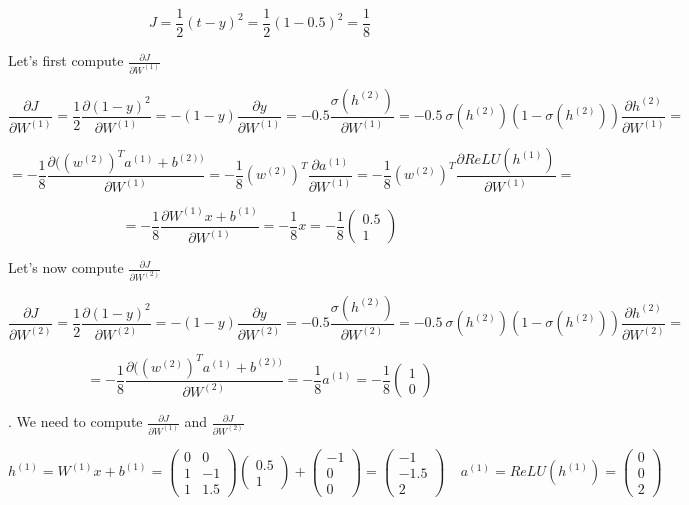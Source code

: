 $$ J = \frac{1}{2} (t - y)^2 = \frac{1}{2} (1 - 0.5)^2 = \frac{1}{8} $$


\noindent Let's first compute $\frac{\partial J}{\partial W^{(1)}}$

$$ \frac{\partial J}{\partial W^{(1)}} = \frac{1}{2} \frac{\partial (1 - y)^2}{\partial W^{(1)}} = 
-(1 - y) \frac{\partial y}{\partial W^{(1)}} = -0.5 \frac{\sigma(h^{(2)})}{\partial W^{(1)}} = -0.5~  \sigma(h^{(2)}) (1 - \sigma(h^{(2)})) \frac{ \partial h^{(2)} }{\partial W^{(1)}} =  $$

$$ = -\frac{1}{8} \frac{\partial ( (w^{(2)})^T a^{(1)} + b^{(2) ) }}{\partial W^{(1)}} =  -\frac{1}{8}(w^{(2)})^T \frac{\partial a^{(1)}}{\partial W^{(1)}} = -\frac{1}{8}(w^{(2)})^T \frac{\partial ReLU(h^{(1)})}{\partial W^{(1)}} =  $$

$$ = -\frac{1}{8} \frac{\partial W^{(1)}x + b^{(1)}}{\partial W^{(1)}} = -\frac{1}{8} x  = -\frac{1}{8} \begin{pmatrix} 0.5 \\ 1 \end{pmatrix}  $$

\newpage
\noindent Let's now compute $\frac{\partial J}{\partial W^{(2)}}$

$$ \frac{\partial J}{\partial W^{(2)}} = \frac{1}{2} \frac{\partial (1 - y)^2}{\partial W^{(2)}} = 
-(1 - y) \frac{\partial y}{\partial W^{(2)}} = -0.5 \frac{\sigma(h^{(2)})}{\partial W^{(2)}} = -0.5~  \sigma(h^{(2)}) (1 - \sigma(h^{(2)})) \frac{ \partial h^{(2)} }{\partial W^{(2)}} =  $$

$$ = -\frac{1}{8} \frac{\partial ( (w^{(2)})^T a^{(1)} + b^{(2) ) }}{\partial W^{(2)}} = -\frac{1}{8}  a^{(1)}  = -\frac{1}{8} \begin{pmatrix} 1 \\ 0 \end{pmatrix}  $$

. We need to compute $ \frac{\partial J}{\partial W^{(1)}}$ and $\frac{\partial J}{\partial W^{(2)}} $

$$ h^{(1)} = W^{(1)}x + b^{(1)} = \begin{pmatrix} 0 & 0 \\ 1 & -1 \\ 1 & 1.5  \end{pmatrix} \begin{pmatrix} 0.5 \\ 1 \end{pmatrix} + \begin{pmatrix} -1\\ 0 \\ 0 \end{pmatrix} = \begin{pmatrix} -1 \\ -1.5 \\ 2 \end{pmatrix} ~~~~~  a^{(1)} = ReLU (h^{(1)}) = \begin{pmatrix} 0 \\ 0 \\ 2 \end{pmatrix} $$

